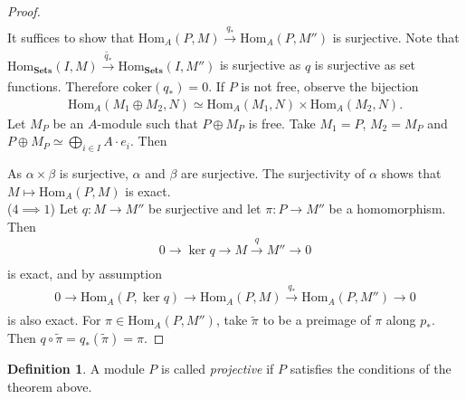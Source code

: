 \documentclass[12pt]{article}
\theoremstyle{plain}
\theoremstyle{remark}
\theoremstyle{definition}
\newtheorem{definition}[theorem]{Definition}
\newcommand{\Hom}[3]{\mathrm{Hom}_{#3}(#1,#2)}
\begin{document}
\begin{proof}
\begin{align*}
    \end{align*}
    It suffices to show that $\Hom{P}{M}{A}\xrightarrow[]{q_*} \Hom{P}{M''}{A}$ is surjective. Note that $\Hom{I}{M}{\mathbf{Sets}}\xrightarrow[]{\tilde{q_*}} \Hom{I}{M''}{\mathbf{Sets}}$ is surjective as $q$ is surjective as set functions. Therefore $\mathrm{coker}(q_*)=0$. If $P$ is not free, observe the bijection
    \begin{align*}
        \Hom{M_1\oplus M_2}{N}{A}\simeq \Hom{M_1}{N}{A}\times \Hom{M_2}{N}{A}.
    \end{align*}
    Let $M_P$ be an $A$-module such that $P\oplus M_P$ is free. Take $M_1=P$, $M_2=M_P$ and $P\oplus M_P\simeq \bigoplus_{i\in I} A\cdot e_i$. Then
    \begin{figure}[H]
        \centering
    \end{figure}
    \noindent As $\alpha\times\beta$ is surjective, $\alpha$ and $\beta$ are surjective. The surjectivity of $\alpha$ shows that $M\mapsto \Hom{P}{M}{A}$ is exact. \\
    ($4\implies 1$) Let $q:M\rightarrow M''$ be surjective and let $\pi:P\rightarrow M''$ be a homomorphism. Then
    \begin{align*}
        0\rightarrow \ker q\rightarrow M\xrightarrow[]{q} M''\rightarrow 0
    \end{align*}
    is exact, and by assumption
    \begin{align*}
        0\rightarrow \Hom{P}{\ker q}{A}\rightarrow \Hom{P}{M}{A}\xrightarrow[]{q_*} \Hom{P}{M''}{A}\rightarrow 0
    \end{align*}
    is also exact. For $\pi\in\Hom{P}{M''}{A}$, take $\tilde{\pi}$ to be a preimage of $\pi$ along $p_*$. Then $q\circ \tilde{\pi} = q_*(\tilde{\pi})=\pi$.
\end{proof}

\begin{definition}
    A module $P$ is called \emph{projective} if $P$ satisfies the conditions of the theorem above.
\end{definition}
\end{document}
